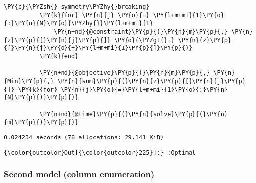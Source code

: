 \begin{Verbatim}[commandchars=\\\{\}]
          \PY{c}{\PYZsh{} symmetry\PYZhy{}breaking}
          \PY{k}{for} \PY{n}{j} \PY{o}{=} \PY{l+m+mi}{1}\PY{o}{:}\PY{n}{N}\PY{o}{\PYZhy{}}\PY{l+m+mi}{1}
              \PY{n+nd}{@constraint}\PY{p}{(}\PY{n}{m}\PY{p}{,} \PY{n}{z}\PY{p}{[}\PY{n}{j}\PY{p}{]} \PY{o}{\PYZgt{}=} \PY{n}{z}\PY{p}{[}\PY{n}{j}\PY{o}{+}\PY{l+m+mi}{1}\PY{p}{]}\PY{p}{)}
          \PY{k}{end}
          
          \PY{n+nd}{@objective}\PY{p}{(}\PY{n}{m}\PY{p}{,} \PY{n}{Min}\PY{p}{,} \PY{n}{sum}\PY{p}{(}\PY{n}{z}\PY{p}{[}\PY{n}{j}\PY{p}{]} \PY{k}{for} \PY{n}{j}\PY{o}{=}\PY{l+m+mi}{1}\PY{o}{:}\PY{n}{N}\PY{p}{)}\PY{p}{)}
          
          \PY{n+nd}{@time}\PY{p}{(}\PY{n}{solve}\PY{p}{(}\PY{n}{m}\PY{p}{)}\PY{p}{)}
\end{Verbatim}


    \begin{Verbatim}[commandchars=\\\{\}]
  0.024234 seconds (78 allocations: 29.141 KiB)

    \end{Verbatim}

\begin{Verbatim}[commandchars=\\\{\}]
{\color{outcolor}Out[{\color{outcolor}225}]:} :Optimal
\end{Verbatim}
           


    \hypertarget{second-model-column-enumeration}{%
\subsubsection{Second model (column
enumeration)}\label{second-model-column-enumeration}}

